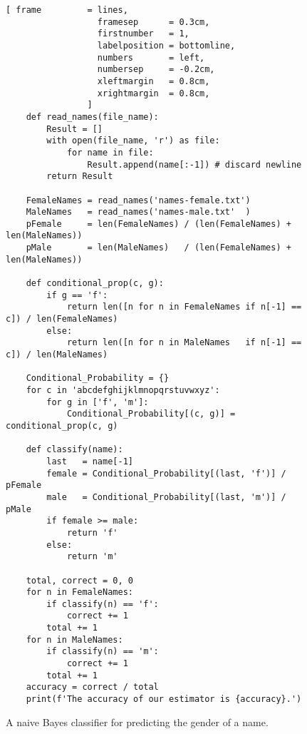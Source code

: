 \begin{figure}[!ht]
\centering
\begin{Verbatim}[ frame         = lines, 
                  framesep      = 0.3cm, 
                  firstnumber   = 1,
                  labelposition = bottomline,
                  numbers       = left,
                  numbersep     = -0.2cm,
                  xleftmargin   = 0.8cm,
                  xrightmargin  = 0.8cm,
                ]
    def read_names(file_name):
        Result = []
        with open(file_name, 'r') as file:
            for name in file:
                Result.append(name[:-1]) # discard newline
        return Result
    
    FemaleNames = read_names('names-female.txt')
    MaleNames   = read_names('names-male.txt'  )
    pFemale     = len(FemaleNames) / (len(FemaleNames) + len(MaleNames))
    pMale       = len(MaleNames)   / (len(FemaleNames) + len(MaleNames))
    
    def conditional_prop(c, g):
        if g == 'f':
            return len([n for n in FemaleNames if n[-1] == c]) / len(FemaleNames)
        else:
            return len([n for n in MaleNames   if n[-1] == c]) / len(MaleNames)
    
    Conditional_Probability = {}
    for c in 'abcdefghijklmnopqrstuvwxyz':
        for g in ['f', 'm']:
            Conditional_Probability[(c, g)] = conditional_prop(c, g)
    
    def classify(name):
        last   = name[-1]
        female = Conditional_Probability[(last, 'f')] / pFemale
        male   = Conditional_Probability[(last, 'm')] / pMale
        if female >= male:
            return 'f'
        else:
            return 'm'
        
    total, correct = 0, 0
    for n in FemaleNames:
        if classify(n) == 'f':
            correct += 1
        total += 1
    for n in MaleNames:
        if classify(n) == 'm':
            correct += 1
        total += 1
    accuracy = correct / total
    print(f'The accuracy of our estimator is {accuracy}.')
\end{Verbatim}
\vspace*{-0.3cm}
\caption{A naive Bayes classifier for predicting the gender of a name.}
\label{fig:gender_prediction.py}
\end{figure}

